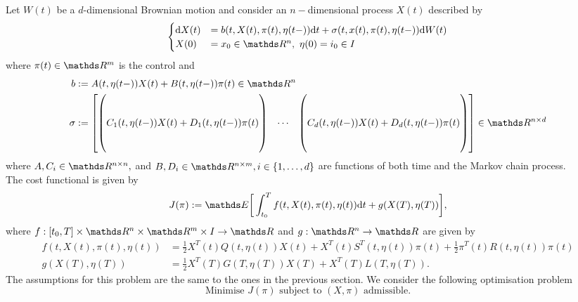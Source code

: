Let $W(t)$ be a $d$-dimensional Brownian motion and consider an $n-$dimensional process $X(t)$ described by
\begin{equation}
    \begin{cases}
        \d X(t) &= b(t, X(t),\pi(t), \eta(t-)) \d t + \sigma(t, x(t), \pi(t), \eta(t-)) \d W(t)\\
         X(0) &= x_0 \in \R^n, \, \, \eta(0) = i_0 \in I
    \end{cases}
    \label{eq: markov_sde}
\end{equation}
where $\pi(t) \in \R^m$ is the control and
\begin{align*}
    b&:= A(t, \eta(t-)) X(t) + B(t, \eta(t-)) \pi (t) \in \R^{n}\\
    \sigma &:= 
    \begin{bmatrix}
        \begin{pmatrix}
            \\
            \\
            C_1(t, \eta(t-)) X(t) + D_1(t, \eta(t-)) \pi(t)\\
            \\
            \\
        \end{pmatrix} 
        & \cdots & 
        \begin{pmatrix}
            \\
            \\
            C_d(t, \eta(t-)) X(t) + D_d(t, \eta(t-)) \pi(t)\\
            \\
            \\
        \end{pmatrix}
    \end{bmatrix}
    \in \R^{n \times d}
\end{align*}
where $A, C_i \in \R^{n \times n},$ and $B, D_i \in \R^{n \times m}, i \in \{1, \dots, d \}$ are functions of both time and the Markov chain process.\\

The cost functional is given by
\begin{equation}
    J(\pi) := \E \bigg[ \int_{t_0}^T f(t, X(t), \pi(t), \eta(t)) \d t + g(X(T), \eta(T))\bigg], \label{eq: markov_cost_functional}
\end{equation}
where $f: [t_0, T] \times \R^n \times \R^m \times I \to \R$ and $g: \R^n \to \R$ are given by
\begin{align*}
    f(t, X(t), \pi(t), \eta(t)) &= \frac{1}{2} X^T(t) Q(t, \eta(t)) X(t) + X^T(t) S^T(t, \eta(t)) \pi(t) + \frac{1}{2}\pi^T(t) R(t, \eta(t)) \pi(t)\\
    g(X(T), \eta(T)) &= \frac12 X^T(T) G(T, \eta(T)) X(T) + X^T(T) L(T, \eta(T)).
\end{align*}
The assumptions for this problem are the same to the ones in the previous section. We consider the following optimisation problem
\begin{equation}
    \text{Minimise } J(\pi) \text{ subject to } (X, \pi) \text{ admissible}.  \label{eq: markov_minimisation_problem}
\end{equation}


